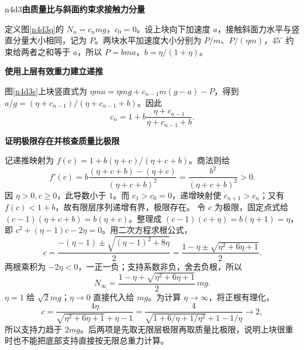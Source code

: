 \begin{drillsolution}{n4d3}\textbf{由质量比与斜面约束求接触力分量}\par\nobreak
定义图\ref{n4d3q}的 $N_n=c_nmg$，$c_0=0$。设上块向下加速度 $a$，接触斜面力水平与竖直分量大小相同，记为 $P$。两块水平加速度大小分别为 $P/m$、$P/(\eta m)$，$45^\circ$ 约束给两者之和等于 $a$，所以 $P=bma$，$b=\eta/(1+\eta)$。



\par\medskip{}\noindent\textbf{使用上层有效重力建立递推}\par\nobreak
图\ref{n4d3s}上块竖直式为 $\eta ma=\eta mg+c_{n-1}m(g-a)-P$，得到 $a/g=(\eta+c_{n-1})/(\eta+c_{n-1}+b)$。因此
\[c_n=1+b\frac{\eta+c_{n-1}}{\eta+c_{n-1}+b}.\]


\par\medskip{}\noindent\textbf{证明极限存在并核查质量比极限}\par\nobreak
记递推映射为 $f(c)=1+b(\eta+c)/(\eta+c+b)$。商法则给
\[
f'(c)=b\frac{(\eta+c+b)-(\eta+c)}{(\eta+c+b)^2}
=\frac{b^2}{(\eta+c+b)^2}>0.
\]
因 $\eta>0,c\ge0$，此导数小于 $1$。而 $c_1>c_0=0$，递增映射使 $c_{n+1}>c_n$；又有 $f(c)<1+b$，故有限层序列递增有界，极限存在。
令 $c$ 为极限，固定点式给
$(c-1)(\eta+c+b)=b(\eta+c)$。整理成
$(c-1)(c+\eta)=b(\eta+1)=\eta$，
即 $c^2+(\eta-1)c-2\eta=0$。用二次方程求根公式，
\[
 c=\frac{-(\eta-1)\pm\sqrt{(\eta-1)^2+8\eta}}2
 =\frac{1-\eta\pm\sqrt{\eta^2+6\eta+1}}2.
\]
两根乘积为 $-2\eta<0$，一正一负；支持系数非负，舍去负根，所以
\[N_\infty=\frac{1-\eta+\sqrt{\eta^2+6\eta+1}}2\,mg.\]
$\eta=1$ 给 $\sqrt2mg$；$\eta\to0$ 直接代入给 $mg$。为计算 $\eta\to\infty$，将正根有理化，
\[
c=\frac{4\eta}{\sqrt{\eta^2+6\eta+1}+\eta-1}
=\frac4{\sqrt{1+6/\eta+1/\eta^2}+1-1/\eta}\longrightarrow2,
\]
所以支持力趋于 $2mg$。后两项是先取无限层极限再取质量比极限，说明上块很重时也不能把底部支持直接按无限总重力计算。
\end{drillsolution}

